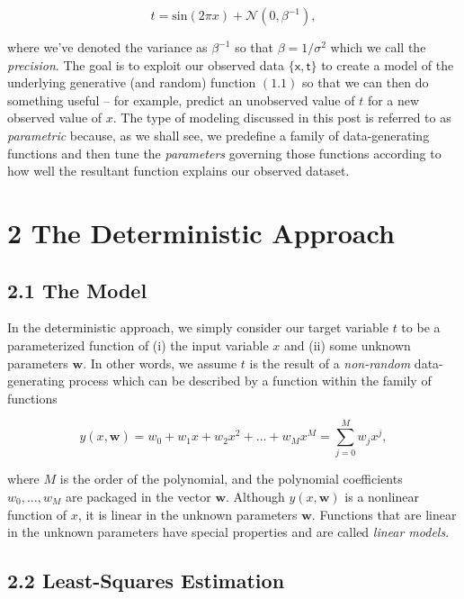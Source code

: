 \documentclass[
  0.875em,
  letterpaper,
  DIV=11,
  numbers=noendperiod]{scrartcl}
\begin{document}
\[
t = \text{sin}(2 \pi x) + \mathcal{N}(0, \beta^{-1}), \tag{1.1}
\]

where we've denoted the variance as \(\beta^{-1}\) so that
\(\beta = 1 / \sigma^2\) which we call the \emph{precision}. The goal is
to exploit our observed data
\(\{ \pmb{\mathsf{x}}, \pmb{\mathsf{t}} \}\) to create a model of the
underlying generative (and random) function \((1.1)\) so that we can
then do something useful -- for example, predict an unobserved value of
\(t\) for a new observed value of \(x\). The type of modeling discussed
in this post is referred to as \emph{parametric} because, as we shall
see, we predefine a family of data-generating functions and then tune
the \emph{parameters} governing those functions according to how well
the resultant function explains our observed dataset.

\hypertarget{the-deterministic-approach}{%
\section{2 The Deterministic
Approach}\label{the-deterministic-approach}}

\hypertarget{the-model}{%
\subsection{2.1 The Model}\label{the-model}}

In the deterministic approach, we simply consider our target variable
\(t\) to be a parameterized function of (i) the input variable \(x\) and
(ii) some unknown parameters \(\mathbf{w}\). In other words, we assume
\(t\) is the result of a \emph{non-random} data-generating process which
can be described by a function within the family of functions

\[
y(x, \mathbf{w}) = w_0 + w_1x + w_2x^2 + \dots + w_Mx^M = \sum_{j=0}^M w_j x^j, \tag{2.1}
\]

where \(M\) is the order of the polynomial, and the polynomial
coefficients \(w_0, ..., w_M\) are packaged in the vector
\(\mathbf{w}\). Although \(y(x, \mathbf{w})\) is a nonlinear function of
\(x\), it is linear in the unknown parameters \(\mathbf{w}\). Functions
that are linear in the unknown parameters have special properties and
are called \emph{linear models}.

\hypertarget{least-squares-estimation}{%
\subsection{2.2 Least-Squares
Estimation}\label{least-squares-estimation}}
\end{document}
